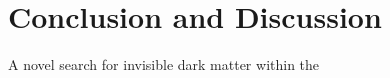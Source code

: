\chapter{Conclusion and Discussion}
\label{conclusion_chapter}

A novel search for invisible dark matter within the 


